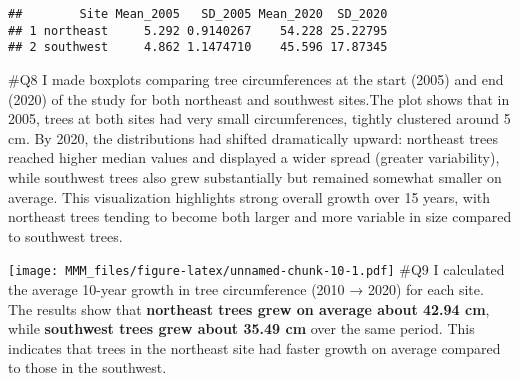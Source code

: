 \documentclass[
]{article}
\newenvironment{Shaded}{\begin{snugshade}}{\end{snugshade}}
\newcommand{\AttributeTok}[1]{\textcolor[rgb]{0.13,0.29,0.53}{#1}}
\newcommand{\CommentTok}[1]{\textcolor[rgb]{0.56,0.35,0.01}{\textit{#1}}}
\newcommand{\FunctionTok}[1]{\textcolor[rgb]{0.13,0.29,0.53}{\textbf{#1}}}
\newcommand{\NormalTok}[1]{#1}
\newcommand{\SpecialCharTok}[1]{\textcolor[rgb]{0.81,0.36,0.00}{\textbf{#1}}}
\newcommand{\StringTok}[1]{\textcolor[rgb]{0.31,0.60,0.02}{#1}}
\begin{document}
\begin{verbatim}
##        Site Mean_2005   SD_2005 Mean_2020  SD_2020
## 1 northeast     5.292 0.9140267    54.228 25.22795
## 2 southwest     4.862 1.1474710    45.596 17.87345
\end{verbatim}

\#Q8 I made boxplots comparing tree circumferences at the start (2005)
and end (2020) of the study for both northeast and southwest sites.The
plot shows that in 2005, trees at both sites had very small
circumferences, tightly clustered around 5 cm. By 2020, the
distributions had shifted dramatically upward: northeast trees reached
higher median values and displayed a wider spread (greater variability),
while southwest trees also grew substantially but remained somewhat
smaller on average. This visualization highlights strong overall growth
over 15 years, with northeast trees tending to become both larger and
more variable in size compared to southwest trees.

\begin{Shaded}
\end{Shaded}

\texttt{[image: MMM\_files/figure-latex/unnamed-chunk-10-1.pdf]} \#Q9 I
calculated the average 10-year growth in tree circumference (2010 →
2020) for each site. The results show that \textbf{northeast trees grew
on average about 42.94 cm}, while \textbf{southwest trees grew about
35.49 cm} over the same period. This indicates that trees in the
northeast site had faster growth on average compared to those in the
southwest.
\end{document}
